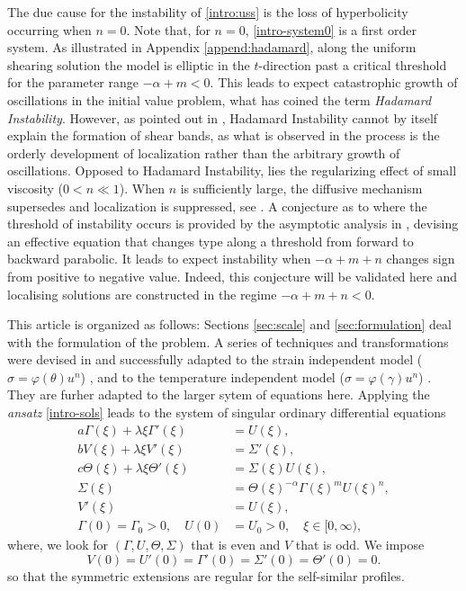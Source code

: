 \documentclass[a4paper,11pt]{article}
\theoremstyle{remark}
\begin{document}
The due cause for the instability of \eqref{intro:uss} is the loss of hyperbolicity occurring when $n=0$. Note that, for $n=0$, \eqref{intro-system0} is a first order system. As illustrated in Appendix \ref{append:hadamard}, along the uniform shearing solution the model is elliptic
in the $t$-direction past a critical threshold for the parameter range $-\alpha+m<0$. This leads to expect catastrophic growth of oscillations in the initial value problem, what has coined the term {\it Hadamard Instability}. However, as pointed out in \cite{KOT14},  Hadamard Instability cannot by itself explain the formation of shear bands, 
as what is observed in the process is the orderly development of localization \cite{zener_effect_1944} rather than the arbitrary growth of oscillations. 
Opposed to Hadamard Instability, lies the regularizing effect of small viscosity ($0 < n \ll 1$).
When $n$ is sufficiently large, the diffusive mechanism supersedes and localization is suppressed, see \cite{DH_1983, Tz_1986, tzavaras_nonlinear_1992}. 
A conjecture as to where the threshold of instability occurs is provided by the asymptotic analysis in  \cite{KT09}, devising
an effective equation that changes type along a threshold from forward to backward parabolic.
 It leads to expect instability when $-\alpha+m+n$ changes sign from positive to negative value. Indeed,
this conjecture will be validated here and localising solutions are constructed in the regime $-\alpha+m+n<0$.

This article is organized as follows: 
Sections \ref{sec:scale} and  \ref{sec:formulation} deal with the formulation of the problem. A series of techniques and transformations were devised in
 \cite{KOT14} and successfully adapted to the strain independent model ($\sigma=\varphi(\theta)u^n$) \cite{KLT_HYP2016}, 
 and to the temperature independent model ($\sigma=\varphi(\gamma)u^n$) \cite{LT16,KLT_2016}. 
 They are furher adapted to the larger sytem of equations here. Applying the {\it ansatz} \eqref{intro-sols} leads to the system of 
 singular ordinary differential equations
\begin{equation} \label{intro:ss-odes}
\begin{aligned}
 a \Gamma(\xi) + \lambda \xi \Gamma'(\xi) &= U(\xi), \\
 b V(\xi) + \lambda \xi V'(\xi) &= \Sigma'(\xi), \\
 c \Theta(\xi) + \lambda \xi \Theta'(\xi)&=\Sigma(\xi) U(\xi),\\
 \Sigma(\xi) &= \Theta(\xi)^{-\alpha} \Gamma(\xi)^m U(\xi)^n, \\
 V'(\xi)&=U(\xi),\\
 \Gamma(0)=\Gamma_0>0, \quad U(0)&=U_0>0, \quad \text{$\xi \in [0,\infty)$},
\end{aligned}
\end{equation}
where, we look for $(\Gamma,U,\Theta,\Sigma)$ that is even and $V$ that is odd. We impose
\begin{equation}
 V(0)=U'(0)=\Gamma'(0)=\Sigma'(0)=\Theta'(0)=0. \label{intro:bdry0}
\end{equation}
so that the symmetric extensions are regular for the self-similar profiles.
\end{document}
